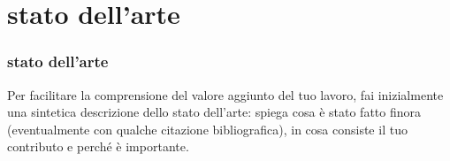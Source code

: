 \section{stato dell'arte}
\begin{frame}
\frametitle{stato dell'arte}
          Per facilitare la comprensione del valore aggiunto del tuo lavoro, fai inizialmente una sintetica
descrizione dello stato dell’arte: spiega cosa è stato fatto finora (eventualmente con qualche citazione
bibliografica), in cosa consiste il tuo contributo e perché è importante.
\end{frame}

